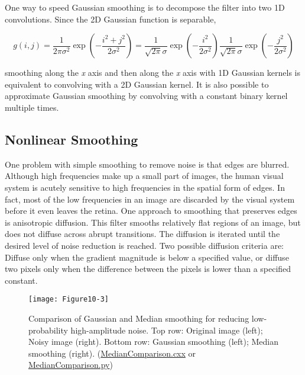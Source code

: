 One way to speed Gaussian smoothing is to decompose the filter into two 1D convolutions. Since the 2D Gaussian function is separable,

\begin{equation}\label{eq:10.1}
g(i, j) = \dfrac{1}{2\pi \sigma^2} \exp\left(-\dfrac{i^2 + j^2}{2\sigma^2} \right)
        = \dfrac{1}{\sqrt{2\pi}\sigma} \exp\left(-\dfrac{i^2}{2\sigma^2} \right)
          \dfrac{1}{\sqrt{2\pi}\sigma} \exp\left(-\dfrac{j^2}{2\sigma^2} \right)
\end{equation}

\noindent smoothing along the \emph{x} axis and then along the \emph{x} axis with 1D Gaussian kernels is equivalent to convolving with a 2D Gaussian kernel. It is also possible to approximate Gaussian smoothing by convolving with a constant binary kernel multiple times.

\subsection{Nonlinear Smoothing}

One problem with simple smoothing to remove noise is that edges are blurred. Although high frequencies make up a small part of images, the human visual system is acutely sensitive to high frequencies in the spatial form of edges. In fact, most of the low frequencies in an image are discarded by the visual system before it even leaves the retina. One approach to smoothing that preserves edges is anisotropic diffusion. This filter smooths relatively flat regions of an image, but does not diffuse across abrupt transitions. The diffusion is iterated until the desired level of noise reduction is reached. Two possible diffusion criteria are: Diffuse only when the gradient magnitude is below a specified value, or diffuse two pixels only when the difference between the pixels is lower than a specified constant.

\begin{figure}[!htb]
	\centering
	\texttt{[image: Figure10-3]}
	\caption{Comparison of Gaussian and Median smoothing for reducing low-probability high-amplitude noise. Top row: Original image (left); Noisy image (right). Bottom row: Gaussian smoothing (left); Median smoothing (right). (\href{https://lorensen.github.io/VTKExamples/site/Cxx/ImageProcessing/MedianComparison/}{MedianComparison.cxx} or \href{https://lorensen.github.io/VTKExamples/site/Python/ImageProcessing/MedianComparison/}{MedianComparison.py})}
	\label{fig:Figure10-3}
\end{figure}


